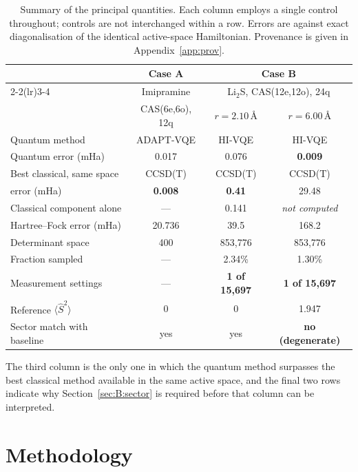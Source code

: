 \documentclass[11pt,a4paper]{article}
\newcommand{\Ang}{\ensuremath{\,\text{\AA}}}
\newcommand{\Ssq}{\ensuremath{\langle \hat{S}^2 \rangle}}
\begin{document}
\begin{table}[htbp]
\centering
\small
\caption{Summary of the principal quantities. Each column employs a single
control throughout; controls are not interchanged within a row. Errors are
against exact diagonalisation of the identical active-space Hamiltonian.
Provenance is given in Appendix~\ref{app:prov}.}
\label{tab:headline}
\begin{tabular}{@{}lccc@{}}
\toprule
& \textbf{Case A} & \multicolumn{2}{c}{\textbf{Case B}} \\
\cmidrule(lr){2-2}\cmidrule(lr){3-4}
& Imipramine & \multicolumn{2}{c}{Li$_2$S, CAS(12e,12o), 24q} \\
& CAS(6e,6o), 12q & $r = 2.10\Ang$ & $r = 6.00\Ang$ \\
\midrule
Quantum method              & ADAPT-VQE & HI-VQE & HI-VQE \\
Quantum error (mHa)         & 0.017 & 0.076 & \textbf{0.009} \\[3pt]
Best classical, same space  & CCSD(T) & CCSD(T) & CCSD(T) \\
\quad error (mHa)           & \textbf{0.008} & \textbf{0.41} & 29.48 \\[3pt]
Classical component alone   & --- & 0.141 & \emph{not computed} \\[3pt]
Hartree--Fock error (mHa)   & 20.736 & 39.5 & 168.2 \\
Determinant space           & 400 & 853{,}776 & 853{,}776 \\
Fraction sampled            & --- & 2.34\% & 1.30\% \\
Measurement settings        & --- & \textbf{1 of 15{,}697} & \textbf{1 of 15{,}697} \\
Reference $\Ssq$            & 0 & 0 & 1.947 \\
Sector match with baseline  & yes & yes & \textbf{no (degenerate)} \\
\bottomrule
\end{tabular}
\end{table}

The third column is the only one in which the quantum method surpasses the best
classical method available in the same active space, and the final two rows
indicate why Section~\ref{sec:B:sector} is required before that column can be
interpreted.

\section{Methodology}
\label{sec:methods}
\end{document}
